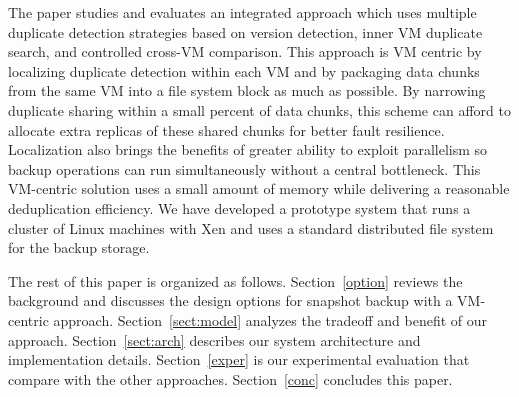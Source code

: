 The paper studies and evaluates  an integrated approach which uses  multiple duplicate detection strategies
based on  version  detection, inner VM duplicate search,
and controlled cross-VM comparison. 
This approach is VM centric by localizing duplicate detection within each VM  
and by packaging data chunks from the same VM into a file system block as much as possible.
By narrowing duplicate sharing within a small percent of data chunks,
this scheme can afford to allocate extra replicas of these shared chunks for better
fault resilience.
Localization also brings the benefits of greater ability to exploit parallelism so
backup operations can run simultaneously without a central  bottleneck.
This  VM-centric solution uses  a small amount of  memory while delivering a reasonable deduplication efficiency. 
We have developed a prototype system that runs a cluster of Linux machines with Xen and uses 
a standard distributed file system for the backup storage. 



The rest of this paper is organized as follows.
Section~\ref{option} reviews the background and discusses the  design options for snapshot backup 
with a VM-centric approach. 
Section~\ref{sect:model}  analyzes the tradeoff and benefit of our approach. 
Section~\ref{sect:arch}  describes our system architecture and implementation details.
Section~\ref{exper} is our experimental evaluation that compare with the other approaches.
Section~\ref{conc}  concludes this paper.



